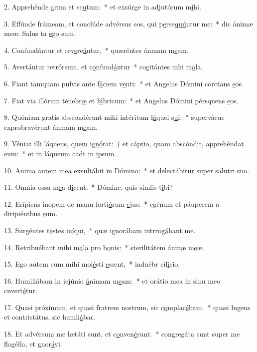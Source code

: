 2. Apprehénde \uline{a}rma et sc\uline{u}tum:~* et exsúrge in adjutórum m\uline{i}hi.\par 
3. Effúnde frámeam, et conclúde advérsus eos, qui p\uline{e}rse\uline{quú}ntur me:~* dic ánimæ meæ: Salus ta \uline{e}go sum.\par 
4. Confundántur et rev\uline{e}re\uline{á}ntur,~* quæréntes ánmam m\uline{e}am.\par 
5. Avertántur retrórsum, et c\uline{o}nfund\uline{á}ntur~* cogitántes mhi m\uline{a}la.\par 
6. Fiant tamquam pulvis ante f\uline{á}ciem v\uline{e}nti:~* et Angelus Dómini corctans \uline{e}os.\par 
7. Fiat via illórum ténebr\uline{æ} et l\uline{ú}bricum:~* et Angelus Dómini pérsquens \uline{e}os.\par 
8. Quóniam gratis abscondérunt mihi intéritum l\uline{á}quei s\uline{u}i:~* supervácue exprobravérunt ánmam m\uline{e}am.\par 
9. Véniat illi láqueus, quem i\uline{gnó}rat:~† et cáptio, quam abscóndit, appreh\uline{é}ndat \uline{e}um:~* et in láqueum cadt in \uline{i}psum.\par 
10. Anima autem mea exsult\uline{á}bit in D\uline{ó}mino:~* et delectábitur super salutri s\uline{u}o.\par 
11. Omnia ossa m\uline{e}a d\uline{i}cent:~* Dómine, quis símlis t\uline{i}bi?\par 
12. Erípiens ínopem de manu forti\uline{ó}rum \uline{e}jus:~* egénum et páuperem a diripiéntbus \uline{e}um.\par 
13. Surgéntes t\uline{e}stes in\uline{í}qui,~* quæ ignorábam intrrog\uline{á}bant me.\par 
14. Retribuébant mihi m\uline{a}la pro b\uline{o}nis:~* sterilitátem ánmæ m\uline{e}æ.\par 
15. Ego autem cum mihi mol\uline{é}sti \uline{e}ssent,~* induébr cil\uline{í}cio.\par 
16. Humiliábam in jejúnio \uline{á}nimam m\uline{e}am:~* et orátio mea in sinu meo cnvert\uline{é}tur.\par 
17. Quasi próximum, et quasi fratrem nostrum, sic c\uline{o}mplac\uline{é}bam:~* quasi lugens et contristátus, sic humli\uline{á}bar.\par 
18. Et advérsum me lætáti sunt, et c\uline{o}nven\uline{é}runt:~* congregáta sunt super me flagélla, et gnor\uline{á}vi.\par 
